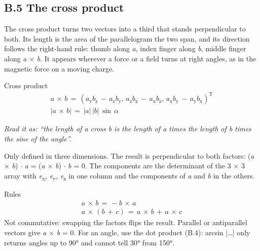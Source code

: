 \documentclass[11pt]{article}
\begin{document}
\begin{keepsection}
\section{B.5 The cross product}

The cross product turns two vectors into a third that stands perpendicular to both. Its length is the area of the parallelogram the two span, and its direction follows the right-hand rule: thumb along \textit{a}, index finger along \textit{b}, middle finger along \textit{a} \ensuremath{\times} \textit{b}. It appears wherever a force or a field turns at right angles, as in the magnetic force on a moving charge.

\begin{equationcard}{Cross product}
\[ \begin{gathered} {a}\, \times \, {b}\, =\, ({a}_{\mathrm{y}}{b}_{\mathrm{z}}\, -\, {a}_{\mathrm{z}}{b}_{\mathrm{y}},\, {a}_{\mathrm{z}}{b}_{\mathrm{x}}\, -\, {a}_{\mathrm{x}}{b}_{\mathrm{z}},\, {a}_{\mathrm{x}}{b}_{\mathrm{y}}\, -\, {a}_{\mathrm{y}}{b}_{\mathrm{x}})^{\mathrm{T}} \\ |{a}\, \times \, {b}|\, =\, |{a}|\, |{b}|\, \sin \, {α} \end{gathered} \]
{\small \emph{Read it as: “the length of a cross b is the length of a times the length of b times the sine of the angle”.}\par Only defined in three dimensions. The result is perpendicular to both factors: (\textit{a} \ensuremath{\times} \textit{b}) \ensuremath{\cdot} \textit{a} = (\textit{a} \ensuremath{\times} \textit{b}) \ensuremath{\cdot} \textit{b} = 0. The components are the determinant of the 3 \ensuremath{\times} 3 array with \textit{e}\textsubscript{x}, \textit{e}\textsubscript{y}, \textit{e}\textsubscript{z} in one column and the components of \textit{a} and \textit{b} in the others.}
\end{equationcard}

\begin{equationcard}{Rules}
\[ \begin{gathered} {a}\, \times \, {b}\, =\, -{b}\, \times \, {a} \\ {a}\, \times \, ({b}\, +\, {c})\, =\, {a}\, \times \, {b}\, +\, {a}\, \times \, {c} \end{gathered} \]
{\small Not commutative: swapping the factors flips the result. Parallel or antiparallel vectors give \textit{a} \ensuremath{\times} \textit{b} = 0. For an angle, use the dot product (B.4): arcsin |…| only returns angles up to 90° and cannot tell 30° from 150°.}
\end{equationcard}


\end{keepsection}
\end{document}

